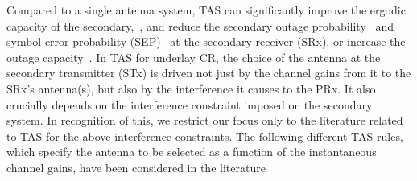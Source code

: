 \documentclass[12pt,draftcls,peerreview,onecolumn]{IEEEtran}
\begin{document}
Compared to a single antenna system, TAS can significantly improve the ergodic capacity of the secondary,~\cite{Hanif_2015_globecom,Wang_2010_TWC}, and reduce the secondary outage probability~\cite{Hanif_2015_globecom,Kong_2011_JCN} and symbol error probability (SEP)~\cite{Sarvendranath_2013_TCOM,Sarvendranath_2014_TCOM} at the secondary receiver (SRx), or increase the outage capacity~\cite{Kong_2011_JCN}. In TAS for underlay CR, the choice of the antenna at the secondary transmitter (STx) is driven not just by the channel gains from it to the SRx's antenna(s), but also by the interference it causes to the PRx. It also crucially depends on the interference constraint imposed on the secondary system. %
In recognition of this, we restrict our focus only to the literature related to TAS for the above interference constraints. The following different TAS rules, which specify the antenna to be selected as a function of the instantaneous channel gains, have been considered in the literature
%
\end{document}
